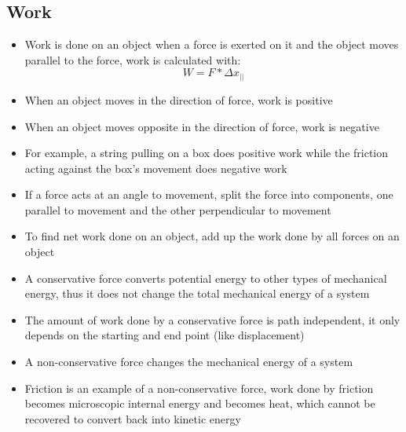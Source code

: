 \subsection{Work}
\begin{itemize}
    \item Work is done on an object when a force is exerted on it and the object moves parallel to the force, work is calculated with: \[W=F*\Delta x_{||}\]
    \item When an object moves in the direction of force, work is positive
    \item When an object moves opposite in the direction of force, work is negative
    \item For example, a string pulling on a box does positive work while the friction acting against the box's movement does negative work
    \item If a force acts at an angle to movement, split the force into components, one parallel to movement and the other perpendicular to movement
    \item To find net work done on an object, add up the work done by all forces on an object
    \item A conservative force converts potential energy to other types of mechanical energy, thus it does not change the total mechanical energy of a system
    \item The amount of work done by a conservative force is path independent, it only depends on the starting and end point (like displacement)
    \item A non-conservative force changes the mechanical energy of a system
    \item Friction is an example of a non-conservative force, work done by friction becomes microscopic internal energy and becomes heat, which cannot be recovered to convert back into kinetic energy
\end{itemize}

